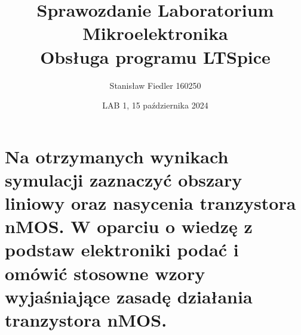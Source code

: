 \documentclass[a4paper, 11pt]{article}
\title{%
	\vspace{-3.5cm}
       \large Sprawozdanie Laboratorium Mikroelektronika \\
       \huge Obsługa programu LTSpice}
\author{Stanisław Fiedler 160250}
\date{LAB 1, 15 października 2024}
\begin{document}
\maketitle
\tableofcontents

\section{Na otrzymanych wynikach symulacji zaznaczyć obszary liniowy oraz nasycenia tranzystora
nMOS. W oparciu o wiedzę z podstaw elektroniki podać i omówić stosowne wzory wyjaśniające zasadę
działania tranzystora nMOS.}\label{sec:zadanie_} %

\end{document}
